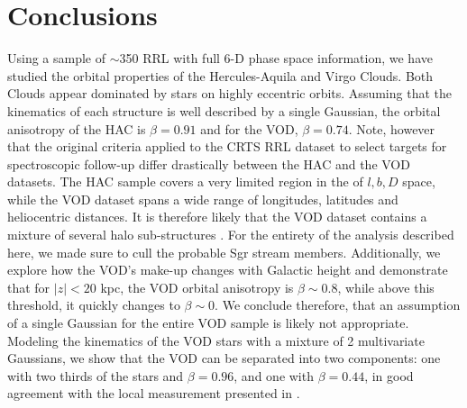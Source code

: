 \documentclass[a4paper,useAMS,usenatbib]{mnras}
\begin{document}
\section{Conclusions}
%
Using a sample of $\sim$350 RRL with full 6-D phase space information,
we have studied the orbital properties of the Hercules-Aquila and
Virgo Clouds. Both Clouds appear dominated by stars on highly
eccentric orbits. Assuming that the kinematics of each structure is
well described by a single Gaussian, the orbital anisotropy of the HAC
is $\beta=0.91$ and for the VOD, $\beta=0.74$. Note, however that the
original criteria applied to the CRTS RRL dataset to select targets
for spectroscopic follow-up differ drastically between the HAC and the
VOD datasets. The HAC sample covers a very limited region in the of
$l,b, D$ space, while the VOD dataset spans a wide range of
longitudes, latitudes and heliocentric distances. It is therefore
likely that the VOD dataset contains a mixture of several halo
sub-structures \citep[see][for a detailed discussion]{Vivas2016}. For
the entirety of the analysis described here, we made sure to cull the
probable Sgr stream members. Additionally, we explore how the VOD's
make-up changes with Galactic height and demonstrate that for $|z|<20$
kpc, the VOD orbital anisotropy is $\beta\sim 0.8$, while above this
threshold, it quickly changes to $\beta\sim0$. We conclude therefore,
that an assumption of a single Gaussian for the entire VOD sample is
likely not appropriate. Modeling the kinematics of the VOD stars with
a mixture of 2 multivariate Gaussians, we show that the VOD can be
separated into two components: one with two thirds of the stars and
$\beta=0.96$, and one with $\beta=0.44$, in good agreement with
the local measurement presented in \citet{Belokurov2018}.
\end{document}
